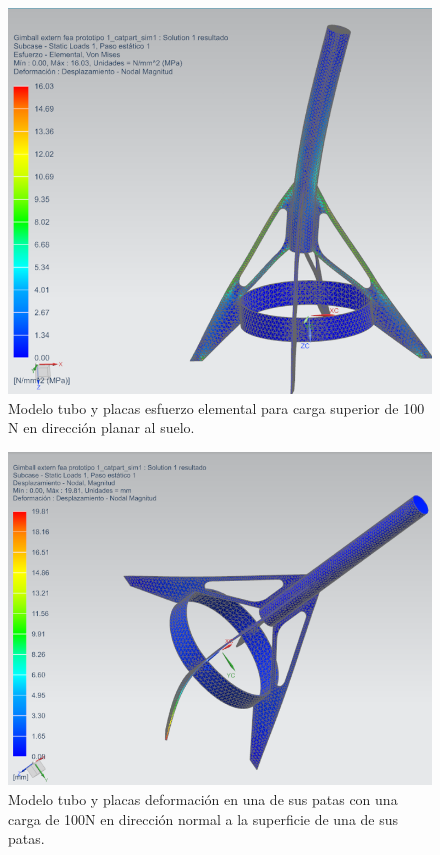 \begin{figure}[htb]
    \centering
    \includegraphics[width=\linewidth]{fig/fea/tuboplaca3.png}
    \caption{Modelo tubo y placas esfuerzo elemental para carga superior de 100 N en dirección planar al suelo.}
    \label{fig:fea/tuboplaca3}
\end{figure}

\begin{figure}[htb]
    \centering
    \includegraphics[width=\linewidth]{fig/fea/tuboplaca4.png}
    \caption{Modelo tubo y placas deformación en una de sus patas con una carga de 100N en dirección normal a la superficie de una de sus patas.}
    \label{fig:fea/tuboplaca4}
\end{figure}

